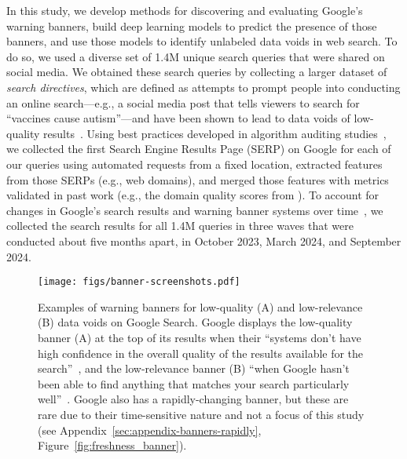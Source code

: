 In this study, we develop methods for discovering and evaluating Google's warning banners, build deep learning models to predict the presence of those banners, and use those models to identify unlabeled data voids in web search.
To do so, we used a diverse set of 1.4M unique search queries that were shared on social media.
We obtained these search queries by collecting a larger dataset of \textit{search directives}, which are defined as attempts to prompt people into conducting an online search---e.g., a social media post that tells viewers to search for ``vaccines cause autism''---and have been shown to lead to data voids of low-quality results~\citep{robertson2023identifying}.
Using best practices developed in algorithm auditing studies~\citep{metaxa2021auditing}, we collected the first Search Engine Results Page (SERP) on Google for each of our queries using automated requests from a fixed location, extracted features from those SERPs (e.g., web domains), and merged those features with metrics validated in past work (e.g., the domain quality scores from \cite{lin2023high}).
To account for changes in Google's search results and warning banner systems over time~\citep{munger2019limited}, we collected the search results for all 1.4M queries in three waves that were conducted about five months apart, in October 2023, March 2024, and September 2024.

\begin{figure}[t!]
\centering
\texttt{[image: figs/banner-screenshots.pdf]}
\caption{Examples of warning banners for low-quality (A) and low-relevance (B) data voids on Google Search. Google displays the low-quality banner (A) at the top of its results when their ``systems don't have high confidence in the overall quality of the results available for the search''~\citep{nayak2022new}, and the low-relevance banner (B) ``when Google hasn't been able to find anything that matches your search particularly well''~\citep{tucker2020getting}. Google also has a rapidly-changing banner, but these are rare due to their time-sensitive nature and not a focus of this study (see Appendix~\ref{sec:appendix-banners-rapidly}, Figure~\ref{fig:freshness_banner}).}
\label{fig:banner_ex}
\end{figure}

